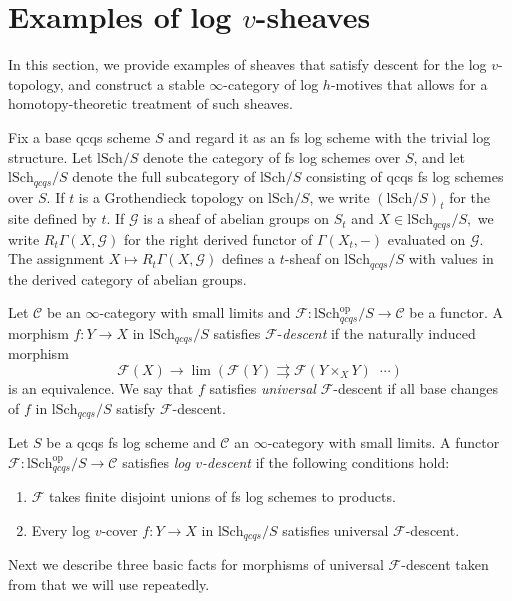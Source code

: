 \documentclass[10pt]{amsart}
\newcommand{\cC}{\mathcal{C}}
\newcommand{\cF}{\mathcal{F}}
\newcommand{\cG}{\mathcal{G}}
\newcommand{\lSch}{\mathrm{lSch}}
\DeclareMathOperator{\rightrightrightarrows}{\substack{\rightarrow \\[-1em] \rightarrow \\[-1em] \rightarrow}}
\begin{document}
\section{Examples of log \texorpdfstring{$v$}{v}-sheaves}
\label{section:Examples of log h-sheaves}
In this section, 
we provide examples of sheaves that satisfy descent for the log $v$-topology, 
and construct a stable $\infty$-category of log $h$-motives that allows for a 
homotopy-theoretic treatment of such sheaves.


Fix a base qcqs scheme $S$ and regard it as an fs log scheme with the trivial log structure. 
Let $\lSch/S$ denote the category of fs log schemes over $S$, and let $\lSch_{qcqs}/S$ denote the full subcategory of $\lSch/S$ consisting of qcqs fs log schemes over $S$.
If $t$ is a Grothendieck topology on $\lSch/S$, we write $(\lSch/S)_t$ for the site defined by $t$.
If $\cG$ is a sheaf of abelian groups on $S_t$ and $X \in \lSch_{qcqs}/S,$ 
we write $R_t\Gamma(X, \cG)$ for the right derived functor of $\Gamma(X_t, -)$ evaluated on $\cG.$ 
The assignment $X \mapsto R_t\Gamma(X, \cG)$ defines a $t$-sheaf on $\lSch_{qcqs}/S$
with values in the derived category of abelian groups.

Let $\cC$ be an $\infty$-category with small limits and $\cF \colon \lSch_{qcqs}^{\text{op}}/S\to \cC$ 
be a functor.
A morphism $f \colon Y \to X$ in $\lSch_{qcqs}/S$ satisfies $\cF$-\emph{descent} 
if the naturally induced morphism 
$$\cF(X) \to \lim \left( \cF(Y) \rightrightarrows \cF(Y \times_X Y) \rightrightrightarrows \cdots \right)$$
is an equivalence.
We say that $f$ satisfies \emph{universal} $\cF$-descent if all 
base changes of $f$ in $\lSch_{qcqs}/S$ satisfy $\cF$-descent.

\begin{definition}\label{def:logvsheaf}
Let $S$ be a qcqs fs log scheme and $\cC$ an $\infty$-category with small limits. 
A functor $\cF \colon \lSch_{qcqs}^{\text{op}}/S \to \cC$ 
satisfies \emph{log $v$-descent} if the following conditions hold:
\begin{enumerate}
\item[(i)] $\cF$ takes finite disjoint unions of fs log schemes to products.
\item[(ii)] Every log $v$-cover $f \colon Y \to X$ in $\lSch_{qcqs}/S$ satisfies universal $\cF$-descent.
\end{enumerate}
\end{definition}

Next we describe three basic facts for morphisms of universal $\cF$-descent taken from 
\cite[Lemma 3.4]{MR4278670} that we will use repeatedly.
\end{document}
